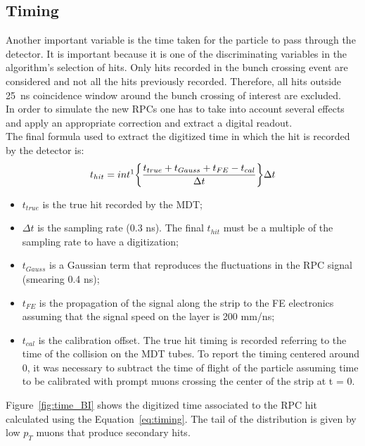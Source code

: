 \FloatBarrier

\clearpage
\subsection{Timing}
\label{sec:timing}
Another important variable is the time taken for the particle to pass through the detector. It is 
important because it is one of the discriminating variables in the algorithm's selection of hits. 
Only hits recorded in the bunch crossing event are considered and not all the hits previously recorded. 
Therefore, all hits outside 25~ns coincidence window around the bunch crossing of interest are 
excluded.\\
In order to simulate the new RPCs one has to take into account several effects and apply an 
appropriate correction and extract a digital readout.\\
The final formula used to extract the digitized time in which the hit is recorded by the detector is:
\begin{equation}
t_{hit}= int\footnotemark\bigg\{\frac{t_{true}+t_{Gauss}+t_{FE}-t_{cal}}{\Delta t}\bigg\}\Delta t
\label{eq:timing}
\end{equation}
\begin{itemize}
	\item $t_{true}$ is the true hit recorded by the MDT;
	\item $\Delta t$ is the sampling rate (0.3 ns). The final $t_{hit}$ must be a multiple of the sampling rate to have a digitization;
	\item $t_{Gauss}$ is a Gaussian term that reproduces the fluctuations in the RPC signal 
	(smearing 0.4 ns);
	\item $t_{FE}$ is the propagation of the signal along the strip to the FE electronics 
	assuming  that the signal speed on the layer is 200 mm/ns;
	\item $t_{cal}$ is the calibration offset. The true hit timing is recorded referring to the time 
	of the collision on the MDT tubes. To report the timing centered around 0, it was necessary to 
	subtract the time of flight of the particle assuming time to be calibrated with 
	prompt muons crossing the center of the strip at t = 0.
\end{itemize} 
Figure~\ref{fig:time_BI} shows the digitized time associated to the RPC hit calculated using the 
Equation~\ref{eq:timing}. The tail of the distribution is given by low $p_T$ muons  that produce 
secondary hits.

